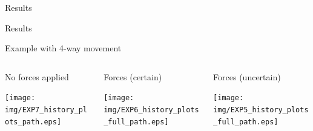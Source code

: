 \documentclass[xcolor=table, 9pt]{beamer}
\begin{document}
\begin{section}{Results}
\begin{frame}{Results}
    \begin{block}{Example with 4-way movement}
    \begin{columns}
        \begin{column}{0.33\textwidth}
            \begin{block}{No forces applied}
                \begin{center}
                     \texttt{[image: img/EXP7\_history\_plots\_path.eps]}
                \end{center}
            \end{block}
        \end{column}
        \begin{column}{0.33\textwidth}
            \begin{block}{Forces (certain)}
                \begin{center}
                      \texttt{[image: img/EXP6\_history\_plots\_full\_path.eps]}
                \end{center}
            \end{block}
        \end{column}
        \begin{column}{0.33\textwidth}
            \begin{block}{Forces (uncertain)}
                \begin{center}
                      \texttt{[image: img/EXP5\_history\_plots\_full\_path.eps]}
                \end{center}
            \end{block}
        \end{column}        
    \end{columns}
    \end{block}
\end{frame}





\end{section}
\end{document}
